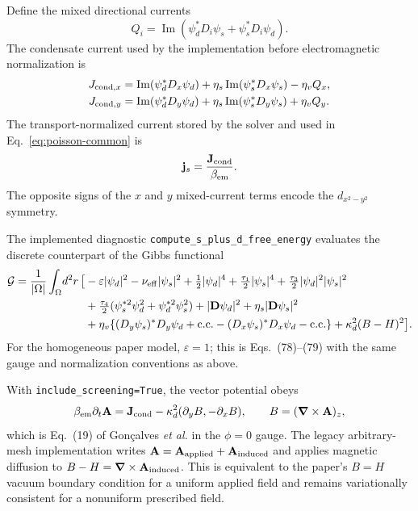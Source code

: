 \documentclass[11pt]{article}
\begin{document}
Define the mixed directional currents
\begin{equation}
    Q_i=\operatorname{Im}\!\left(
        \psi_d^*D_i\psi_s+\psi_s^*D_i\psi_d
    \right).
\end{equation}
The condensate current used by the implementation before electromagnetic
normalization is
\begin{align}
    J_{{\rm cond},x}&=
      \operatorname{Im}(\psi_d^*D_x\psi_d)
      +\eta_s\operatorname{Im}(\psi_s^*D_x\psi_s)-\eta_vQ_x,\\
    J_{{\rm cond},y}&=
      \operatorname{Im}(\psi_d^*D_y\psi_d)
      +\eta_s\operatorname{Im}(\psi_s^*D_y\psi_s)+\eta_vQ_y.
\end{align}
The transport-normalized current stored by the solver and used in
Eq.~\eqref{eq:poisson-common} is
\begin{equation}
    \mathbf j_s=\frac{\mathbf J_{\rm cond}}{\beta_{\rm em}}.
    \label{eq:sd-current}
\end{equation}
The opposite signs of the $x$ and $y$ mixed-current terms encode the
$d_{x^2-y^2}$ symmetry.

The implemented diagnostic \texttt{compute\_s\_plus\_d\_free\_energy}
evaluates the discrete counterpart of the Gibbs functional
\begin{align}
 \mathcal G=\frac{1}{|\Omega|}\int_\Omega\!d^2r\,\bigl[&
  -\varepsilon|\psi_d|^2-\nu_{\rm eff}|\psi_s|^2
  +\tfrac12|\psi_d|^4+\tfrac{\tau_1}{2}|\psi_s|^4
  +\tfrac{\tau_3}{2}|\psi_d|^2|\psi_s|^2\\
  &+\tfrac{\tau_4}{2}
    (\psi_s^{*2}\psi_d^2+\psi_d^{*2}\psi_s^2)
  +|\mathbf D\psi_d|^2+\eta_s|\mathbf D\psi_s|^2\\
  &+\eta_v\{(D_y\psi_s)^*D_y\psi_d+\mathrm{c.c.}
               -(D_x\psi_s)^*D_x\psi_d-\mathrm{c.c.}\}
  +\kappa_d^2(B-H)^2\bigr].
\end{align}
For the homogeneous paper model, $\varepsilon=1$; this is Eqs.~(78)--(79)
with the same gauge and normalization conventions as above.

With \texttt{include\_screening=True}, the vector potential obeys
\begin{equation}
    \beta_{\rm em}\partial_t\mathbf A
      =\mathbf J_{\rm cond}
       -\kappa_d^2(\partial_yB,-\partial_xB),
    \qquad B=(\boldsymbol\nabla\times\mathbf A)_z,
\end{equation}
which is Eq.~(19) of Gon\c{c}alves \textit{et al.} in the $\phi=0$ gauge.
The legacy arbitrary-mesh implementation writes
$\mathbf A=\mathbf A_{\rm applied}
+\mathbf A_{\rm induced}$ and applies magnetic diffusion to
$B-H=\boldsymbol\nabla\times\mathbf A_{\rm induced}$.  This is equivalent to
the paper's $B=H$ vacuum boundary condition for a uniform applied field and
remains variationally consistent for a nonuniform prescribed field.
\end{document}
